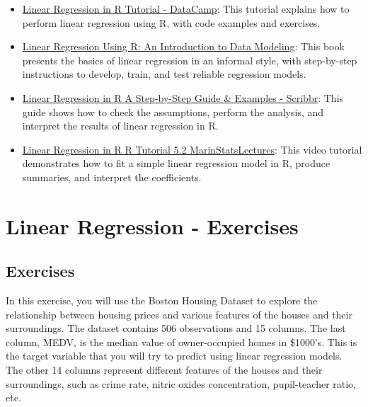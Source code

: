 \documentclass[
]{book}
\providecommand{\tightlist}{%
  \setlength{\itemsep}{0pt}\setlength{\parskip}{0pt}}
\begin{document}
\begin{itemize}
\tightlist
\item
  \href{https://www.datacamp.com/tutorial/linear-regression-R}{Linear Regression in R Tutorial - DataCamp}: This tutorial explains how to perform linear regression using R, with code examples and exercises.
\item
  \href{https://open.umn.edu/opentextbooks/textbooks/399}{Linear Regression Using R: An Introduction to Data Modeling}: This book presents the basics of linear regression in an informal style, with step-by-step instructions to develop, train, and test reliable regression models.
\item
  \href{https://www.scribbr.com/statistics/linear-regression-in-r/}{Linear Regression in R \textbar{} A Step-by-Step Guide \& Examples - Scribbr}: This guide shows how to check the assumptions, perform the analysis, and interpret the results of linear regression in R.
\item
  \href{https://www.r-bloggers.com/2021/10/multiple-linear-regression-made-simple/}{Linear Regression in R \textbar{} R Tutorial 5.2 \textbar{} MarinStatsLectures}: This video tutorial demonstrates how to fit a simple linear regression model in R, produce summaries, and interpret the coefficients.
\end{itemize}

\hypertarget{lin-e}{%
\chapter{Linear Regression - Exercises}\label{lin-e}}

\hypertarget{exercises}{%
\section{Exercises}\label{exercises}}

In this exercise, you will use the Boston Housing Dataset to explore the relationship between housing prices and various features of the houses and their surroundings. The dataset contains 506 observations and 15 columns. The last column, MEDV, is the median value of owner-occupied homes in \$1000's. This is the target variable that you will try to predict using linear regression models. The other 14 columns represent different features of the houses and their surroundings, such as crime rate, nitric oxides concentration, pupil-teacher ratio, etc.
\end{document}
